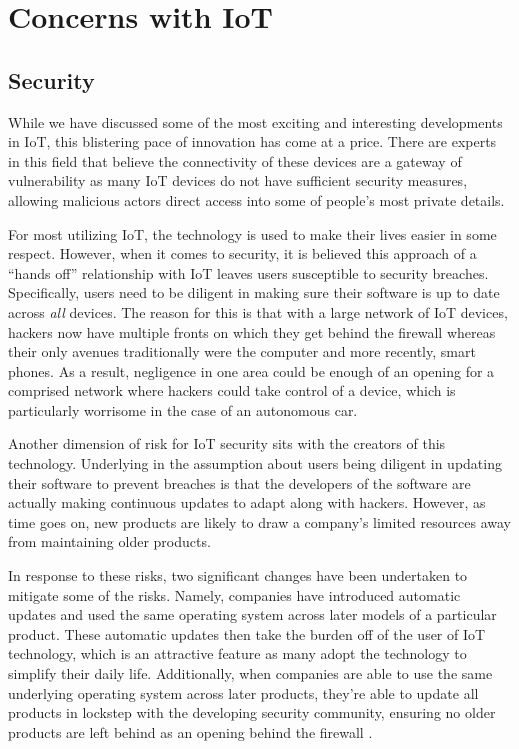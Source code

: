 \documentclass[sigconf]{acmart}
\begin{document}
\section{Concerns with IoT}
\subsection{Security}
While we have discussed some of the most exciting and interesting developments in IoT, this blistering pace of innovation has come at a price. There are experts in this field that believe the connectivity of these devices are a gateway of vulnerability as many IoT devices do not have sufficient security measures, allowing malicious actors direct access into some of people's most private details. 

For most utilizing IoT, the technology is used to make their lives easier in some respect. However, when it comes to security, it is believed this approach of a ``hands off'' relationship with IoT leaves users susceptible to security breaches. Specifically, users need to be diligent in making sure their software is up to date across \emph{all} devices. The reason for this is that with a large network of IoT devices, hackers now have multiple fronts on which they get behind the firewall whereas their only avenues traditionally were the computer and more recently, smart phones. As a result, negligence in one area could be enough of an opening for a comprised network where hackers could take control of a device, which is particularly worrisome in the case of an autonomous car. 

Another dimension of risk for IoT security sits with the creators of this technology. Underlying in the assumption about users being diligent in updating their software to prevent breaches is that the developers of the software are actually making continuous updates to adapt along with hackers. However, as time goes on, new products are likely to draw a company's limited resources away from maintaining older products. 

In response to these risks, two significant changes have been undertaken to mitigate some of the risks. Namely, companies have introduced automatic updates and used the same operating system across later models of a particular product. These automatic updates then take the burden off of the user of IoT technology, which is an attractive feature as many adopt the technology to simplify their daily life. Additionally, when companies are able to use the same underlying operating system across later products, they're able to update all products in lockstep with the developing security community, ensuring no older products are left behind as an opening behind the firewall \cite{updateiot}. 
\end{document}
